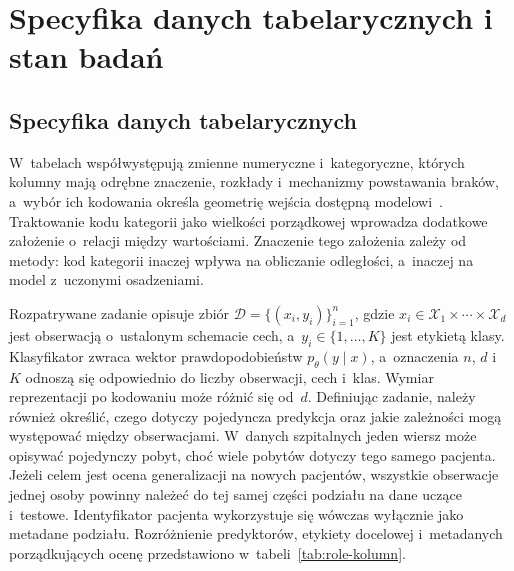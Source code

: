 \clearpage
\section{Specyfika danych tabelarycznych i stan badań}
\label{chap:stan-badan}

\subsection{Specyfika danych tabelarycznych}
\label{sec:definicja-tabel}

W~tabelach współwystępują zmienne numeryczne i~kategoryczne, których kolumny mają odrębne znaczenie, rozkłady i~mechanizmy powstawania braków, a~wybór ich kodowania określa geometrię wejścia dostępną modelowi~\cite{borisov2022survey}. Traktowanie kodu kategorii jako wielkości porządkowej wprowadza dodatkowe założenie o~relacji między wartościami. Znaczenie tego założenia zależy od metody: kod kategorii inaczej wpływa na obliczanie odległości, a~inaczej na model z~uczonymi osadzeniami.

Rozpatrywane zadanie opisuje zbiór $\mathcal{D}=\{(x_i,y_i)\}_{i=1}^{n}$, gdzie $x_i\in\mathcal{X}_1\times\cdots\times\mathcal{X}_d$ jest obserwacją o~ustalonym schemacie cech, a~$y_i\in\{1,\ldots,K\}$ jest etykietą klasy. Klasyfikator zwraca wektor prawdopodobieństw $p_\theta(y\mid x)$, a~oznaczenia $n$, $d$ i~$K$ odnoszą się odpowiednio do liczby obserwacji, cech i~klas. Wymiar reprezentacji po kodowaniu może różnić się od~$d$. Definiując zadanie, należy również określić, czego dotyczy pojedyncza predykcja oraz jakie zależności mogą występować między obserwacjami. W~danych szpitalnych jeden wiersz może opisywać pojedynczy pobyt, choć wiele pobytów dotyczy tego samego pacjenta. Jeżeli celem jest ocena generalizacji na nowych pacjentów, wszystkie obserwacje jednej osoby powinny należeć do tej samej części podziału na dane uczące i~testowe. Identyfikator pacjenta wykorzystuje się wówczas wyłącznie jako metadane podziału. Rozróżnienie predyktorów, etykiety docelowej i~metadanych porządkujących ocenę przedstawiono w~tabeli~\ref{tab:role-kolumn}.

